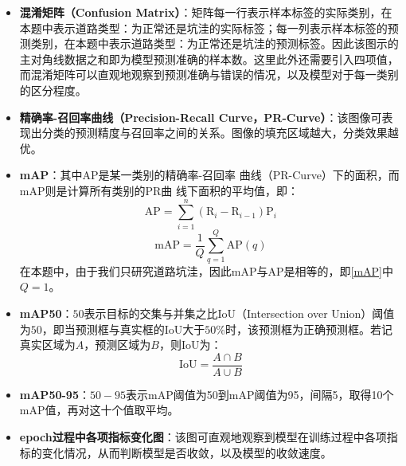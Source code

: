 \documentclass{MathorCupmodeling}
\begin{document}
\begin{itemize}
		\item \textbf{混淆矩阵（Confusion Matrix）}：矩阵每一行表示样本标签的实际类别，在本题中表示道路类型：为正常还是坑洼的实际标签；每一列表示样本标签的预测类别，在本题中表示道路类型：为正常还是坑洼的预测标签。因此该图示的主对角线数据之和即为模型预测准确的样本数。这里此外还需要引入四项值，而混淆矩阵可以直观地观察到预测准确与错误的情况，以及模型对于每一类别的区分程度。
		\item \textbf{精确率-召回率曲线（Precision-Recall Curve，PR-Curve）}：该图像可表现出分类的预测精度与召回率之间的关系\textcolor{blue}{\cite{Yellowbrick}}。图像的填充区域越大，分类效果越优。
		\item \textbf{mAP}：其中AP是某一类别的精确率-召回率
		曲线（PR-Curve）下的面积，而mAP则是计算所有类别的PR曲
		线下面积的平均值，即：
		\begin{equation}
			\mathrm{AP}=\sum\limits_{i=1}^n\left(\mathrm{R}_i-\mathrm{R}_{i-1}\right)\mathrm{P}_i
		\end{equation}
		\begin{equation}\label{mAP}
			\mathrm{mAP}=\frac{1}{Q}\sum\limits_{q=1}^Q\mathrm{AP}\left(q\right)
		\end{equation}
		在本题中，由于我们只研究道路坑洼，因此mAP与AP是相等的，即\textcolor{blue}{\eqref{mAP}}中$Q=1$。
		\item \textbf{mAP50}：$50$表示目标的交集与并集之比IoU（Intersection over Union）阈值为$50$，即当预测框与真实框的IoU大于$50\%$时，该预测框为正确预测框。若记真实区域为$A$，预测区域为$B$，则IoU为：
		\begin{equation}
			\mathrm{IoU}=\frac{A\cap B}{A\cup B}
		\end{equation}
		\item \textbf{mAP50-95}：$50-95$表示mAP阈值为50到mAP阈值为95，间隔5，取得10个mAP值，再对这十个值取平均\textcolor{blue}{\cite{指标}}。
		\item \textbf{epoch过程中各项指标变化图}：该图可直观地观察到模型在训练过程中各项指标的变化情况，从而判断模型是否收敛，以及模型的收敛速度。
	\end{itemize}
\end{document}
